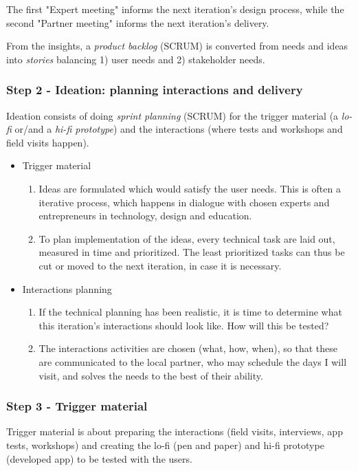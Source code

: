     The first "Expert meeting" informs the next iteration's design process, while the second "Partner meeting" informs the next iteration's delivery.

    From the insights, a \textit{product backlog} (SCRUM) is converted from needs and ideas into \textit{stories} balancing 1) user needs and 2) stakeholder needs.

\subsubsection{Step 2 - Ideation: planning interactions and delivery}
  Ideation consists of doing \textit{sprint planning} (SCRUM) for the trigger material (a \textit{lo-fi} or/and a \textit{hi-fi prototype}) and the interactions (where tests and workshops and field visits happen).

    \begin{itemize}
    \item Trigger material
      \begin{enumerate}
      \item Ideas are formulated which would satisfy the user needs. This is often a iterative process, which happens in dialogue with chosen experts and entrepreneurs in technology, design and education.
      \item To plan implementation of the ideas, every technical task are laid out, measured in time and prioritized. The least prioritized tasks can thus be cut or moved to the next iteration, in case it is necessary.
      \end{enumerate}
    \item Interactions planning
      \begin{enumerate}
      \item If the technical planning has been realistic, it is time to determine what this iteration's interactions should look like. How will this be tested?
      \item The interactions activities are chosen (what, how, when), so that these are communicated to the local partner, who may schedule the days I will visit, and solves the needs to the best of their ability.
      \end{enumerate}
    \end{itemize}

  \subsubsection{Step 3 - Trigger material}
  Trigger material is about preparing the interactions (field visits, interviews, app tests, workshops) and creating the lo-fi (pen and paper) and hi-fi prototype (developed app) to be tested with the users.

